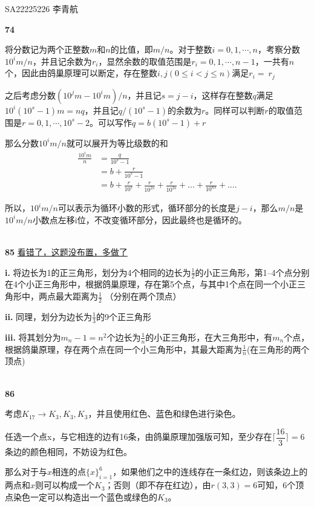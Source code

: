 \documentclass[UTF8]{ctexart}
\begin{document}
SA22225226 李青航

\noindent \textbf{74}

将分数记为两个正整数$m$和$n$的比值，即$m/n$。对于整数$i = 0,1, \cdots , n$，考察分数$10^i m / n$，并且记余数为$r_i$，显然余数的取值范围是$r_i = 0, 1, \cdots, n-1$，一共有$n$个，因此由鸽巢原理可以断定，存在整数$i, j (0 \le i < j \le n)$满足$r_i = \ r_j$

之后考虑分数$(10^jm-10^im) / n$，并且记$s = j-i$，这样存在整数$q$满足$10^{i}(10^s - 1)m = nq$，并且记$q/(10^s-1)$的余数为$r$。同样可以判断$r$的取值范围是$r = 0, 1, \cdots, 10^s -2$。可以写作$q = b(10^s -1) + r$

那么分数$10^i m /n$就可以展开为等比级数的和
\begin{equation}
\nonumber
\begin{split}
\frac{10^i m}{n}&=\frac{q}{10^s -1 }\\
&=b+\frac{r}{10^s-1}\\
&=b+ \frac{r}{10^s}+\frac{r}{10^{2s}}+\frac{r}{10^{3s}}+...+\frac{r}{10^{ns}}+....
\end{split}
\end{equation}

所以，$10^i m/n$可以表示为循环小数的形式，循环部分的长度是$j-i$，那么$m/n$是$10^im/n$小数点左移i位，不改变循环部分，因此最终也是循环的。

~\\

\noindent \textbf{85}    \underline{看错了，这题没布置，多做了}

\textbf{i. }将边长为1的正三角形，划分为4个相同的边长为$\frac{1}{2}$的小正三角形，第1--4个点分别在4个小正三角形中，根据鸽巢原理，存在第5个点，与其中1个点在同一个小正三角形中，两点最大距离为$\frac{1}{2}$ （分别在两个顶点）

\textbf{ii. }同理，划分为边长为$\frac{1}{3}$的9个正三角形

\textbf{iii. }将其划分为$m_n-1=n^2$个边长为$\frac{1}{n}$的小正三角形，在大三角形中，有$m_n$个点，根据鸽巢原理，存在两个点在同一个小三角形中，其最大距离为$\frac{1}{n}$(在三角形的两个顶点)

~\\

\noindent \textbf{86}

考虑$K_{17} \rightarrow K_3, K_3, K_3$，并且使用红色、蓝色和绿色进行染色。

任选一个点x，与它相连的边有16条，由鸽巢原理加强版可知，至少存在$\lceil \dfrac{16}{3} \rceil = 6$条边的颜色相同，不妨设为红色。

那么对于与$x$相连的点$\{ x\} _{i=1}^6$，如果他们之中的连线存在一条红边，则该条边上的两点和$x$则可以构成一个$K_3$；否则（即不存在红边），由$r(3, 3) = 6$可知，6个顶点染色一定可以构造出一个蓝色或绿色的$K_3$。
\end{document}
